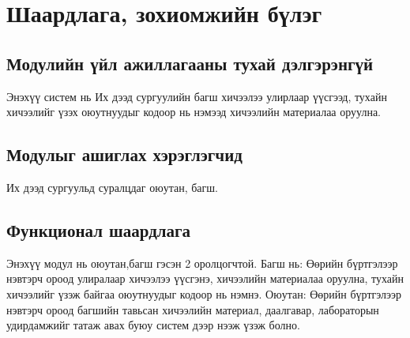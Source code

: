 
\chapter{Шаардлага, зохиомжийн бүлэг} %
\label{Chapter2} %

\section{Модулийн үйл ажиллагааны тухай дэлгэрэнгүй }
Энэхүү систем нь Их дээд сургуулийн багш хичээлээ улирлаар үүсгээд, тухайн хичээлийг үзэх оюутнуудыг кодоор нь нэмээд хичээлийн материалаа оруулна.

\section{Модулыг ашиглах хэрэглэгчид}
Их дээд сургуульд суралцдаг оюутан, багш.
\section{Функционал шаардлага}
 Энэхүү модул нь оюутан,багш гэсэн 2 оролцогчтой.
Багш нь: Өөрийн бүртгэлээр нэвтэрч ороод улиралаар хичээлээ үүсгэнэ, хичээлийн материалаа оруулна, тухайн хичээлийг үзэж байгаа оюутнуудыг кодоор нь нэмнэ.
Оюутан: Өөрийн бүртгэлээр нэвтэрч ороод багшийн тавьсан хичээлийн материал, даалгавар, лабораторын удирдамжийг татаж авах буюу систем дээр нээж үзэж болно.

